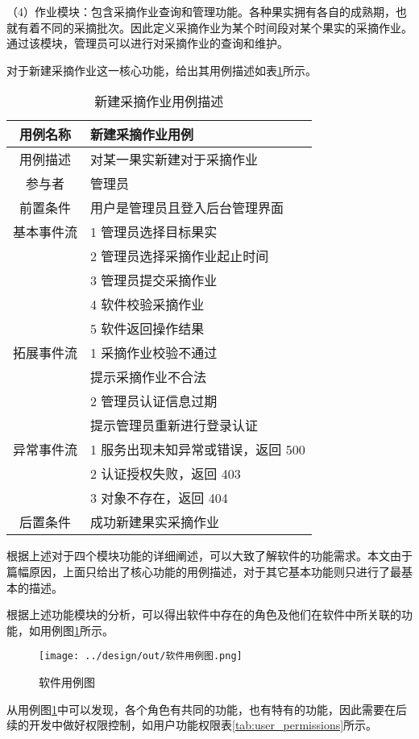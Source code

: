 （4）作业模块：包含采摘作业查询和管理功能。各种果实拥有各自的成熟期，也就有着不同的采摘批次。因此定义采摘作业为某个时间段对某个果实的采摘作业。通过该模块，管理员可以进行对采摘作业的查询和维护。

对于新建采摘作业这一核心功能，给出其用例描述如表\ref{tab:uc-work-new}所示。

\newpage
\begin{longtable}[ht]{|c|l|}
\caption{新建采摘作业用例描述}
\label{tab:uc-work-new}
\\
\hline
用例名称 & 新建采摘作业用例 \\
\hline
用例描述 & 对某一果实新建对于采摘作业 \\
\hline
参与者 & 管理员 \\
\hline
前置条件 & 用户是管理员且登入后台管理界面 \\
\hline
基本事件流 & 1 管理员选择目标果实 \\
& 2 管理员选择采摘作业起止时间 \\
& 3 管理员提交采摘作业 \\
& 4 软件校验采摘作业 \\
& 5 软件返回操作结果 \\
\hline
拓展事件流 & 1 采摘作业校验不通过 \\
& \indent 1.1 提示采摘作业不合法 \\
& 2 管理员认证信息过期 \\
& \indent 2.1 提示管理员重新进行登录认证 \\
\hline
异常事件流 & 1 服务出现未知异常或错误，返回 500 \\
& 2 认证授权失败，返回 403 \\
& 3 对象不存在，返回 404 \\
\hline
后置条件 & 成功新建果实采摘作业 \\
\hline
\end{longtable}

根据上述对于四个模块功能的详细阐述，可以大致了解软件的功能需求。本文由于篇幅原因，上面只给出了核心功能的用例描述，对于其它基本功能则只进行了最基本的描述。

根据上述功能模块的分析，可以得出软件中存在的角色及他们在软件中所关联的功能，如用例图\ref{fig:软件用例图}所示。

\begin{figure}[H]
    \centering
    \texttt{[image: ../design/out/软件用例图.png]}
    \caption{软件用例图}
    \label{fig:软件用例图}
\end{figure}

从用例图\ref{fig:软件用例图}中可以发现，各个角色有共同的功能，也有特有的功能，因此需要在后续的开发中做好权限控制，如用户功能权限表\ref{tab:user_permissions}所示。


